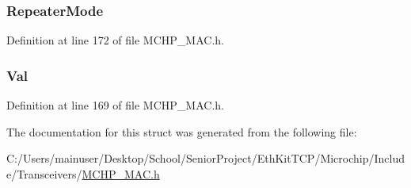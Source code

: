 \subsubsection[{Repeater\+Mode}]{ Repeater\+Mode}\label{struct_m_a_c_i_n_i_t___p_a_r_a_m_a0f95711f2c45472b9cd255e1ea4d2190}


Definition at line 172 of file M\+C\+H\+P\+\_\+\+M\+A\+C.\+h.

\hypertarget{struct_m_a_c_i_n_i_t___p_a_r_a_m_a5ab8c2bf45b20b5f7aa3a4f083896cec}{}
\subsubsection[{Val}]{ Val}\label{struct_m_a_c_i_n_i_t___p_a_r_a_m_a5ab8c2bf45b20b5f7aa3a4f083896cec}


Definition at line 169 of file M\+C\+H\+P\+\_\+\+M\+A\+C.\+h.



The documentation for this struct was generated from the following file\+:\begin{DoxyCompactItemize}
\item 
C\+:/\+Users/mainuser/\+Desktop/\+School/\+Senior\+Project/\+Eth\+Kit\+T\+C\+P/\+Microchip/\+Include/\+Transceivers/\hyperlink{_m_c_h_p___m_a_c_8h}{M\+C\+H\+P\+\_\+\+M\+A\+C.\+h}\end{DoxyCompactItemize}
